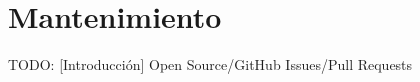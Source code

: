 \chapter{Mantenimiento\label{cap:mantenimiento}}

TODO: [Introducción]
  {Open Source/GitHub Issues/Pull Requests}